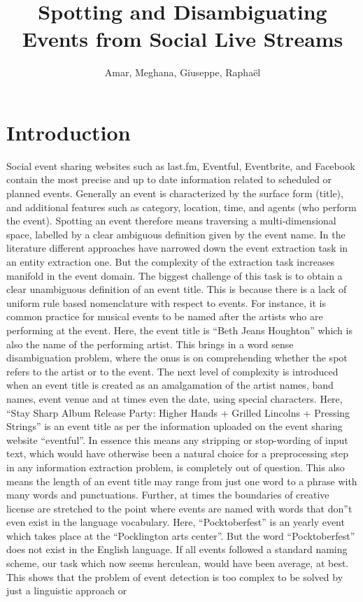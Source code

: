 \documentclass[10pt,a4paper]{article}
\author{Amar, Meghana, Giuseppe, Rapha\"el}
\title{Spotting and Disambiguating Events from Social Live Streams}
\begin{document}
\maketitle
\section{Introduction}
Social event sharing websites such as last.fm, Eventful, Eventbrite, and Facebook contain the most precise and up to date information related to scheduled or planned events. 
Generally an event is characterized by the surface form (title), and additional features such as category, location, time, and agents (who perform the event). Spotting an event therefore means traversing a multi-dimensional space, labelled by a clear ambiguous definition given by the event name. 
In the literature different approaches have narrowed down the event extraction task in an entity extraction one. But the complexity of the extraction task increases manifold in the event domain. The biggest challenge of this task is to obtain a clear unambiguous definition of an event title. This is because there is a lack of uniform rule based nomenclature with respect to events. \newline
{\color{red}{G:need to cut off the many examples, which are verbose}}\newline
For instance, it is common practice for musical events to be named after the artists who are performing at the event. Here, the event title is ``Beth Jeans Houghton'' which is also the name of the performing artist. This brings in a word sense disambiguation problem, where the onus is on comprehending whether the spot refers to the artist or to the event. The next level of complexity is introduced when an event title is created as an amalgamation of the artist names, band names, event venue and at times even the date, using special characters. Here, ``Stay Sharp Album Release Party: Higher Hands + Grilled Lincolns + Pressing Strings'' is an event title as per the information uploaded on the event sharing website ``eventful''. In essence this means any stripping or stop-wording of input text, which would have otherwise been a natural choice for a preprocessing step in any information extraction problem, is completely out of question. This also means the length of an event title may range from just one word to a phrase with many words and punctuations. Further, at times the boundaries of creative license are stretched to the point where events are named with words that don''t even exist in the language vocabulary. Here, ``Pocktoberfest'' is an yearly event which takes place at the ``Pocklington arts center''. But the word ``Pocktoberfest'' does not exist in the English language. If all events followed a standard naming scheme, our task which now seems herculean, would have been average, at best. This shows that the problem of event detection is too complex to be solved by just a linguistic approach or \newline
\end{document}
